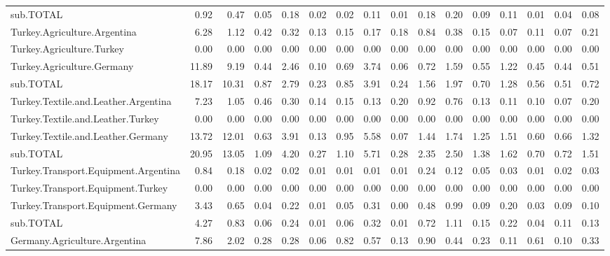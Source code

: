 \documentclass[a4paper]{article}\usepackage[]{graphicx}\usepackage[]{color}
\begin{document}
\begin{sidewaystable}[htbp]
\begin{tabular}{lrrrrrrrrrrrrrrr}
    sub.TOTAL & 0.92  & 0.47  & 0.05  & 0.18  & 0.02  & 0.02  & 0.11  & 0.01  & 0.18  & 0.20  & 0.09  & 0.11  & 0.01  & 0.04  & 0.08 \\
    Turkey.Agriculture.Argentina & 6.28  & 1.12  & 0.42  & 0.32  & 0.13  & 0.15  & 0.17  & 0.18  & 0.84  & 0.38  & 0.15  & 0.07  & 0.11  & 0.07  & 0.21 \\
    Turkey.Agriculture.Turkey & 0.00  & 0.00  & 0.00  & 0.00  & 0.00  & 0.00  & 0.00  & 0.00  & 0.00  & 0.00  & 0.00  & 0.00  & 0.00  & 0.00  & 0.00 \\
    Turkey.Agriculture.Germany & 11.89 & 9.19  & 0.44  & 2.46  & 0.10  & 0.69  & 3.74  & 0.06  & 0.72  & 1.59  & 0.55  & 1.22  & 0.45  & 0.44  & 0.51 \\
    sub.TOTAL & 18.17 & 10.31 & 0.87  & 2.79  & 0.23  & 0.85  & 3.91  & 0.24  & 1.56  & 1.97  & 0.70  & 1.28  & 0.56  & 0.51  & 0.72 \\
    Turkey.Textile.and.Leather.Argentina & 7.23  & 1.05  & 0.46  & 0.30  & 0.14  & 0.15  & 0.13  & 0.20  & 0.92  & 0.76  & 0.13  & 0.11  & 0.10  & 0.07  & 0.20 \\
    Turkey.Textile.and.Leather.Turkey & 0.00  & 0.00  & 0.00  & 0.00  & 0.00  & 0.00  & 0.00  & 0.00  & 0.00  & 0.00  & 0.00  & 0.00  & 0.00  & 0.00  & 0.00 \\
    Turkey.Textile.and.Leather.Germany & 13.72 & 12.01 & 0.63  & 3.91  & 0.13  & 0.95  & 5.58  & 0.07  & 1.44  & 1.74  & 1.25  & 1.51  & 0.60  & 0.66  & 1.32 \\
    sub.TOTAL & 20.95 & 13.05 & 1.09  & 4.20  & 0.27  & 1.10  & 5.71  & 0.28  & 2.35  & 2.50  & 1.38  & 1.62  & 0.70  & 0.72  & 1.51 \\
    Turkey.Transport.Equipment.Argentina & 0.84  & 0.18  & 0.02  & 0.02  & 0.01  & 0.01  & 0.01  & 0.01  & 0.24  & 0.12  & 0.05  & 0.03  & 0.01  & 0.02  & 0.03 \\
    Turkey.Transport.Equipment.Turkey & 0.00  & 0.00  & 0.00  & 0.00  & 0.00  & 0.00  & 0.00  & 0.00  & 0.00  & 0.00  & 0.00  & 0.00  & 0.00  & 0.00  & 0.00 \\
    Turkey.Transport.Equipment.Germany & 3.43  & 0.65  & 0.04  & 0.22  & 0.01  & 0.05  & 0.31  & 0.00  & 0.48  & 0.99  & 0.09  & 0.20  & 0.03  & 0.09  & 0.10 \\
    sub.TOTAL & 4.27  & 0.83  & 0.06  & 0.24  & 0.01  & 0.06  & 0.32  & 0.01  & 0.72  & 1.11  & 0.15  & 0.22  & 0.04  & 0.11  & 0.13 \\
    Germany.Agriculture.Argentina & 7.86  & 2.02  & 0.28  & 0.28  & 0.06  & 0.82  & 0.57  & 0.13  & 0.90  & 0.44  & 0.23  & 0.11  & 0.61  & 0.10  & 0.33 \\

\end{tabular}
\end{sidewaystable}
\end{document}
